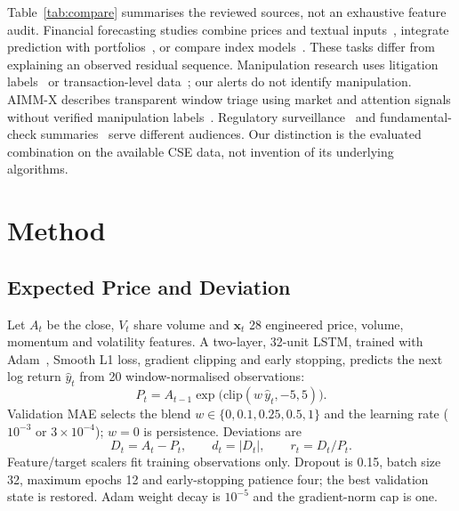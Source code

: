 \documentclass[conference]{IEEEtran}
\begin{document}
Table~\ref{tab:compare} summarises the reviewed sources, not an exhaustive feature audit. Financial forecasting studies combine prices and textual inputs~\cite{sirimevan2019,kumarasinghe2019}, integrate prediction with portfolios~\cite{nanayakkara2021}, or compare index models~\cite{vithushan2025}. These tasks differ from explaining an observed residual sequence. Manipulation research uses litigation labels~\cite{golmohammadi2014} or transaction-level data~\cite{cao2015}; our alerts do not identify manipulation. AIMM-X describes transparent window triage using market and attention signals without verified manipulation labels~\cite{neela2026}. Regulatory surveillance~\cite{ciro_smarts,dailymirror_sec2024} and fundamental-check summaries~\cite{simplywallst_snowflake} serve different audiences. Our distinction is the evaluated combination on the available CSE data, not invention of its underlying algorithms.

\section{Method}
\subsection{Expected Price and Deviation}
Let $A_t$ be the close, $V_t$ share volume and $\mathbf{x}_t$ 28 engineered price, volume, momentum and volatility features. A two-layer, 32-unit LSTM, trained with Adam~\cite{kingma2015}, Smooth L1 loss, gradient clipping and early stopping, predicts the next log return $\hat y_t$ from 20 window-normalised observations:
\begin{equation}
P_t=A_{t-1}\exp\!\big(\mathrm{clip}(w\,\hat y_t,-5,5)\big).
\end{equation}
Validation MAE selects the blend $w\in\{0,0.1,0.25,0.5,1\}$ and the learning rate ($10^{-3}$ or $3\times10^{-4}$); $w=0$ is persistence. Deviations are
\begin{equation}
D_t=A_t-P_t,\qquad d_t=|D_t|,\qquad r_t=D_t/P_t.
\end{equation}
Feature/target scalers fit training observations only. Dropout is 0.15, batch size 32, maximum epochs 12 and early-stopping patience four; the best validation state is restored. Adam weight decay is $10^{-5}$ and the gradient-norm cap is one.
\end{document}
